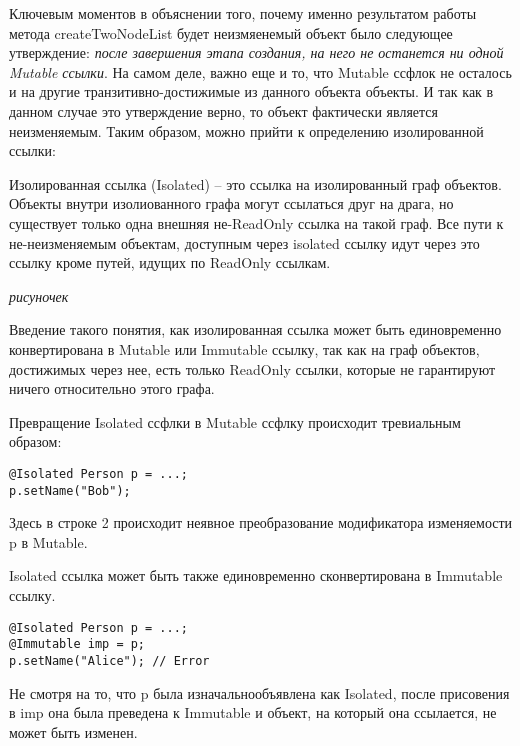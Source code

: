 Ключевым моментов в объяснении того, почему именно результатом работы метода createTwoNodeList будет неизмяенемый объект было следующее утверждение: \textit{после завершения этапа создания, на него не останется ни одной Mutable ссылки}. На самом деле, важно еще и то, что Mutable ссфлок не осталось и на другие транзитивно-достижимые из данного объекта объекты. И так как в данном случае это утверждение верно, то объект фактически является неизменяемым. Таким образом, можно прийти к определению изолированной ссылки:

\begin{Def}\label{isolated_ref}
Изолированная ссылка (Isolated) -- это ссылка на изолированный граф объектов. Объекты внутри изолиованного графа могут ссылаться друг на драга, но существует только одна внешняя не-ReadOnly ссылка на такой граф. Все пути к не-неизменяемым объектам, доступным через isolated ссылку идут через это ссылку кроме путей, идущих по ReadOnly ссылкам.
\end{Def}

\textit{рисуночек} 

Введение такого понятия, как изолированная ссылка может быть единовременно конвертирована в Mutable или Immutable ссылку, так как на граф объектов, достижимых через нее, есть только ReadOnly ссылки, которые не гарантируют ничего относительно этого графа. 

Превращение Isolated ссфлки в Mutable ссфлку происходит тревиальным образом:

\begin{lstlisting}[caption=Превращение Isolated ссылки в Mutable, label=code:isolated_to_mutable]
@Isolated Person p = ...;
p.setName("Bob");
\end{lstlisting} 

Здесь в строке 2 происходит неявное преобразование модификатора изменяемости p в Mutable.

Isolated ссылка может быть также единовременно сконвертирована в Immutable ссылку.

\begin{lstlisting}[caption=Превращение Isolated ссылки в immutable, label=code:isolated_to_immutable]
@Isolated Person p = ...;
@Immutable imp = p;
p.setName("Alice"); // Error
\end{lstlisting} 

Не смотря на то, что p была изначальнообъявлена как Isolated, после присовения в imp она была преведена к Immutable и объект, на который она ссылается, не может быть изменен.

